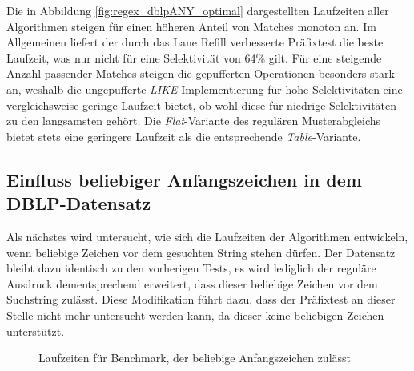 Die in Abbildung \ref{fig:regex_dblpANY_optimal} dargestellten Laufzeiten aller Algorithmen steigen für einen höheren Anteil von Matches monoton an.
Im Allgemeinen liefert der durch das Lane Refill verbesserte Präfixtest die beste Laufzeit, was nur nicht für eine Selektivität von 64\% gilt.
Für eine steigende Anzahl passender Matches steigen die gepufferten Operationen besonders stark an, weshalb die ungepufferte \emph{LIKE}-Implementierung für hohe Selektivitäten eine vergleichsweise geringe Laufzeit bietet, ob wohl diese für niedrige Selektivitäten zu den langsamsten gehört.
Die \emph{Flat}-Variante des regulären Musterabgleichs bietet stets eine geringere Laufzeit als die entsprechende \emph{Table}-Variante.

\subsection{Einfluss beliebiger Anfangszeichen in dem DBLP-Datensatz}

Als nächstes wird untersucht, wie sich die Laufzeiten der Algorithmen entwickeln, wenn beliebige Zeichen vor dem gesuchten String stehen dürfen.
Der Datensatz bleibt dazu identisch zu den vorherigen Tests, es wird lediglich der reguläre Ausdruck dementsprechend erweitert, dass dieser beliebige Zeichen vor dem Suchstring zulässt.
Diese Modifikation führt dazu, dass der Präfixtest an dieser Stelle nicht mehr untersucht werden kann, da dieser keine beliebigen Zeichen unterstützt.

\begin{figure}[ht]
	\centering
	\caption{Laufzeiten für Benchmark, der beliebige Anfangszeichen zulässt}
	\label{fig:regex_ANYdblpANY}
\end{figure}

